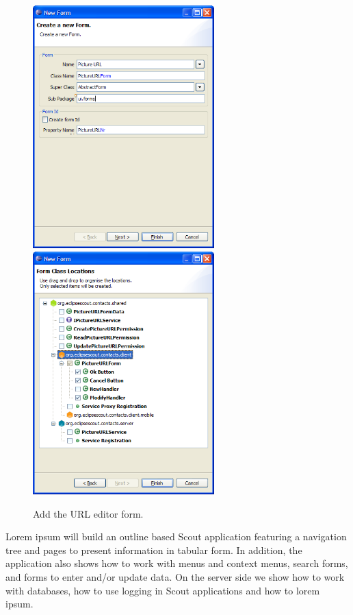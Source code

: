\documentclass[a4paper,10pt,twoside]{book}
\begin{document}
\begin{figure}
\includegraphics[width=7cm]{new_form_url_1.png} \hspace{5mm}
\includegraphics[width=7cm]{new_form_url_2.png}
\caption{Add the URL editor form.}
\end{figure}

Lorem ipsum will build an outline based Scout application featuring a navigation tree and pages to present information in tabular form. 
In addition, the application also shows how to work with menus and context menus, search forms, and forms to enter and/or update data. 
On the server side we show how to work with databases, how to use logging in Scout applications and how to lorem ipsum. 
\end{document}
